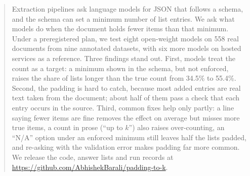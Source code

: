 \begin{abstract}
Extraction pipelines ask language models for JSON that follows a schema, and the schema can set a minimum number of list entries.
We ask what models do when the document holds fewer items than that minimum.
Under a preregistered plan, we test eight open-weight models on 558 real documents from nine annotated datasets, with six more models on hosted services as a reference.
Three findings stand out.
First, models treat the count as a target: a minimum shown in the schema, but not enforced, raises the share of lists longer than the true count from 34.5\% to 55.4\%.
Second, the padding is hard to catch, because most added entries are real text taken from the document; about half of them pass a check that each entry occurs in the source.
Third, common fixes help only partly: a line saying fewer items are fine removes the effect on average but misses more true items, a count in prose (``up to $k$'') also raises over-counting, an ``N/A'' option under an enforced minimum still leaves half the lists padded, and re-asking with the validation error makes padding far more common.
We release the code, answer lists and run records at \url{https://github.com/AbhishekBarali/padding-to-k}.
\end{abstract}
